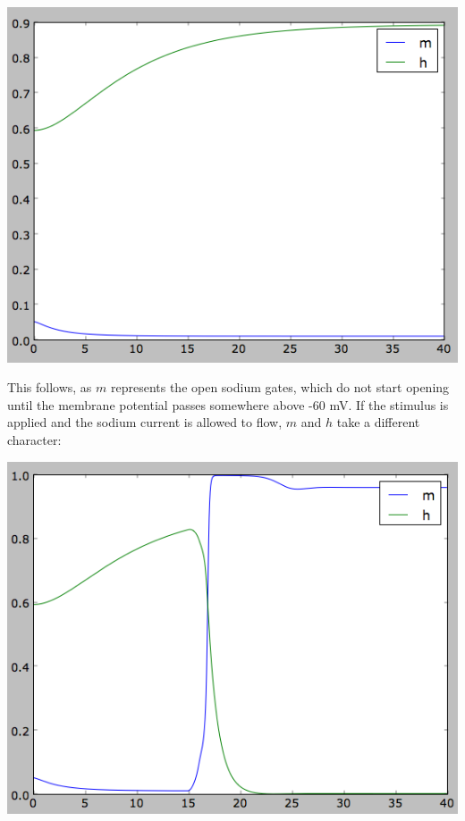 \documentclass[12pt]{article}
\begin{document}
\vspace{10pt}
\includegraphics[scale=0.67]{leakequilibrium.png}
\vspace{10pt}

This follows, as $m$ represents the open sodium gates, which do not start opening until the membrane potential passes somewhere above -60 mV.  If the stimulus is applied and the sodium current is allowed to flow, $m$ and $h$ take a different character:

\vspace{10pt}
\includegraphics[scale=0.54]{naequilibrium.png}
\vspace{10pt}
\end{document}
